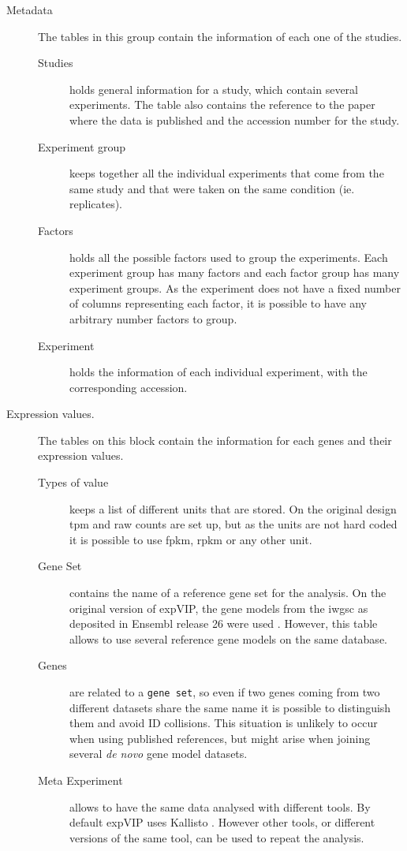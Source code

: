 \begin{description}
\item[Metadata] The tables in this group contain the information of each one of the studies. 
\begin{description}
\item[Studies] holds general information for a study, which contain several experiments. The table also contains the reference to the paper where the data is published and the accession number for the study. 
\item[Experiment group] keeps together all the individual experiments that come from the same study and that were taken on the same condition (ie. replicates). 
\item[Factors] holds all the possible factors used to group the experiments. Each experiment group has many factors and each factor group has many experiment groups. As the experiment does not have a fixed number of columns representing each factor, it is possible to have any arbitrary number factors to group. 
\item[Experiment] holds the information of each individual experiment, with the corresponding accession. 
\end{description}
\item[Expression values.] The tables on this block contain the information for each genes and their expression values. 
\begin{description}
\item[Types of value] keeps a list of different units that are stored. On the original design \acrshort{tpm} and raw counts are set up, but as the units are not hard coded it is possible to use \acrshort{fpkm}, \acrshort{rpkm} or any other unit. 
\item[Gene Set] contains the name of a reference gene set for the analysis. On the original version of expVIP, the gene models from the \acrshort{iwgsc} as deposited in Ensembl release 26 were used \citep{Mayer2014}. However, this table allows to use several reference gene models on the same database. 
\item[Genes] are related to a \texttt{gene set}, so even if two genes coming from two different datasets share the same name it is possible to distinguish them and avoid ID collisions. This situation is unlikely to occur when using published references, but might arise when joining several \textit{de novo} gene model datasets. 
\item[Meta Experiment] allows to have the same data analysed with different tools. By default expVIP uses Kallisto \citep{Bray2016}. However other tools, or different versions of the same tool, can be used to repeat the analysis.   

\end{description}
\end{description}
